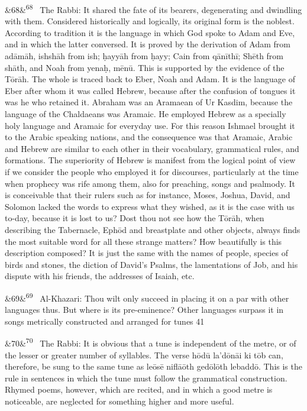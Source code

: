 \documentclass[12pt]{article}
\newcommand{\para}[1][]{\par\noindent\ifx&#1&\else\textsuperscript{\footnotesize #1}~\fi}
\begin{document}
\para[68] The Rabbi: It shared the fate of its bearers, degenerating and dwindling with them. Considered historically and logically, its original form is the noblest. According to tradition it is the language in which God spoke to Adam and Eve, and in which the latter conversed. It is proved by the derivation of Adam from adāmāh, ishshāh from ish; ḥayyāh from ḥayy; Cain from qānīthī; Shēth from shāth, and Noah from yenaḥ, mēnū. This is supported by the evidence of the Tōrāh. The whole is traced back to Eber, Noah and Adam. It is the language of Eber after whom it was called Hebrew, because after the confusion of tongues it was he who retained it. Abraham was an Aramaean of Ur Kasdim, because the language of the Chaldaeans was Aramaic. He employed Hebrew as a specially holy language and Aramaic for everyday use. For this reason Ishmael brought it to the Arabic speaking nations, and the consequence was that Aramaic, Arabic and Hebrew are similar to each other in their vocabulary, grammatical rules, and formations. The superiority of Hebrew is manifest from the logical point of view if we consider the people who employed it for discourses, particularly at the time when prophecy was rife among them, also for preaching, songs and psalmody. It is conceivable that their rulers such as for instance, Moses, Joshua, David, and Solomon lacked the words to express what they wished, as it is the case with us to-day, because it is lost to us? Dost thou not see how the Tōrāh, when describing the Tabernacle, Ephōd and breastplate and other objects, always finds the most suitable word for all these strange matters? How beautifully is this description composed? It is just the same with the names of people, species of birds and stones, the diction of David's Psalms, the lamentations of Job, and his dispute with his friends, the addresses of Isaiah, etc.

\para[69] Al-Khazari: Thou wilt only succeed in placing it on a par with other languages thus. But where is its pre-eminence? Other languages surpass it in songs metrically constructed and arranged for tunes 41

\para[70] The Rabbi: It is obvious that a tune is independent of the metre, or of the lesser or greater number of syllables. The verse hōdū la’dōnāi ki tōb can, therefore, be sung to the same tune as leōsē niflāōth gedōlōth lebaddō. This is the rule in sentences in which the tune must follow the grammatical construction. Rhymed poems, however, which are recited, and in which a good metre is noticeable, are neglected for something higher and more useful.
\end{document}
